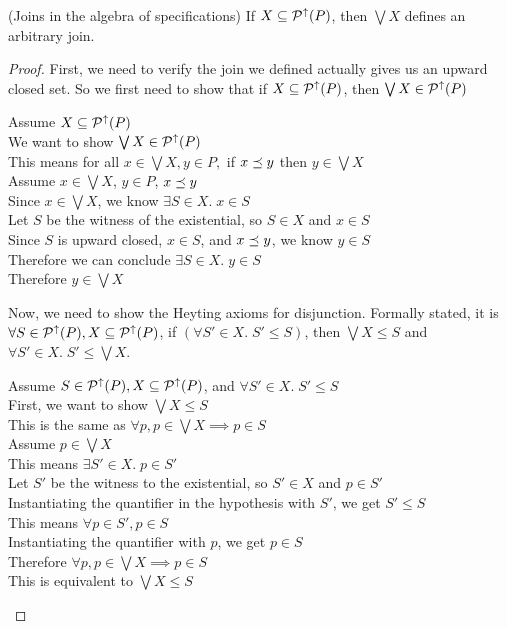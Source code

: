 \begin{lemma}{(Joins in the algebra of specifications)}
If $X \subseteq \mathcal{P}^{\uparrow}({P})$, then $\bigvee X$ defines an arbitrary join. 
\end{lemma}
\begin{proof}
First, we need to verify the join we defined actually gives us an upward closed set.
So we first need to show that if $X \subseteq \mathcal{P}^{\uparrow}({P})$, then $\bigvee{X} \in \mathcal{P}^{\uparrow}({P})$

\vspace{0.5em}

\begin{tabbedproof}
\oo Assume  $X \subseteq \mathcal{P}^{\uparrow}({P})$ \\
\ooo We want to show $\bigvee{X} \in \mathcal{P}^{\uparrow}({P})$ \\
\ooo This means for all $x \in \bigvee{X}, y \in P,$ if $x \preceq y$ then $y \in \bigvee{X}$\\
\ooo Assume $x \in \bigvee X$, $y \in P$, $x \preceq y$ \\
\oooo Since $x \in \bigvee X$, we know $\exists S \in X.\; x \in S$ \\
\oooo Let $S$ be the witness of the existential, so $S \in X$ and $x \in S$ \\ 
\ooooo  Since $S$ is upward closed, $x \in S$, and $x \preceq y$, we know $y \in S$ \\
\ooo Therefore we can conclude $\exists S \in X.\; y \in S$ \\
\ooo Therefore $y \in \bigvee X$ \\
\end{tabbedproof}

\noindent Now, we need to show the Heyting axioms for disjunction. Formally stated, it is $\forall S \in \mathcal{P}^{\uparrow}({P}), X \subseteq
\mathcal{P}^{\uparrow}({P})$, if $(\forall S' \in X.\; S' \leq S)$, then $\bigvee X \leq
S$ and $\forall S' \in X.\; S' \leq \bigvee X$.

\vspace{0.5em}

\begin{tabbedproof}
\oo Assume $S \in \mathcal{P}^{\uparrow}({P}), X \subseteq \mathcal{P}^{\uparrow}({P})$, and $\forall S' \in X.\; S' \leq S$ \\
\ooo First, we want to show $\bigvee X \leq S$ \\
\oooo This is the same as $\forall p, p \in \bigvee X \implies p \in S$ \\
\oooo Assume $p \in \bigvee X$ \\
\ooooo This means $\exists S' \in X.\; p \in S'$ \\
\ooooo Let $S'$ be the witness to the existential, so $S' \in X$ and $p \in S'$ \\
\oooooo Instantiating the quantifier in the hypothesis with $S'$, we get $S' \leq S$ \\
\oooooo This means $\forall p \in S', p \in S$ \\
\oooooo Instantiating the quantifier with $p$, we  get $p \in S$ \\
\oooo Therefore $\forall p, p \in \bigvee X \implies p \in S$ \\
\oooo This is equivalent to $\bigvee X \leq S$ \\[1em]


\end{tabbedproof}
\end{proof}
